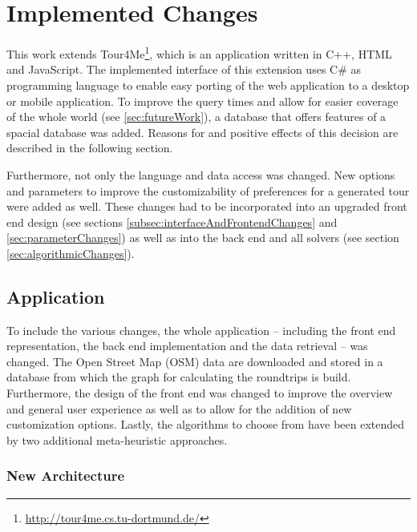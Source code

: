 \chapter{Implemented Changes}
\label{chapter:implementedChanges}

This work extends Tour4Me\footnote{\url{http://tour4me.cs.tu-dortmund.de/}}, which is an application written in C++, HTML and JavaScript. 
The implemented interface of this extension uses C\# as programming language to enable easy porting of the web application to a desktop or mobile application.
To improve the query times and allow for easier coverage of the whole world (see \ref{sec:futureWork}), a database that offers features of a spacial database was added. 
Reasons for and positive effects of this decision are described in the following section.

Furthermore, not only the language and data access was changed.
New options and parameters to improve the customizability of preferences for a generated tour were added as well.
These changes had to be incorporated into an upgraded front end design (see sections \ref{subsec:interfaceAndFrontendChanges} and \ref{sec:parameterChanges}) as well as into the back end and all solvers (see section \ref{sec:algorithmicChanges}). 


\section{Application}
\label{sec:application}

To include the various changes, the whole application -- including the front end representation, the back end implementation and the data retrieval -- was changed.
The Open Street Map (OSM) data are downloaded and stored in a database from which the graph for calculating the roundtrips is build.
Furthermore, the design of the front end was changed to improve the overview and general user experience as well as to allow for the addition of new customization options.
Lastly, the algorithms to choose from have been extended by two additional meta-heuristic approaches.

\subsection{New Architecture}
\label{sec:newArchitecture}

